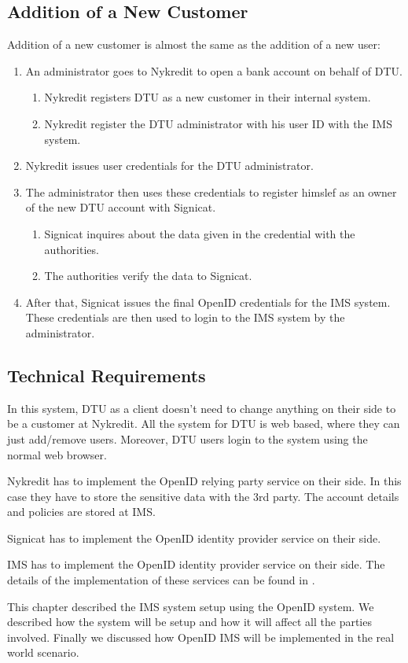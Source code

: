 \FloatBarrier
\subsection{Addition of a New Customer}
Addition of a new customer is almost the same as the addition of a new user:
\begin{enumerate}
	\item An administrator goes to Nykredit to open a bank account on behalf of DTU. 
	\begin{enumerate}
		\item Nykredit registers DTU as a new customer in their internal system.
		\item Nykredit register the DTU administrator with his user ID with the IMS system.
	\end{enumerate}
	\item Nykredit issues user credentials for the  DTU administrator.
	\item The administrator then uses these credentials to register himslef as an owner of the new DTU account with Signicat. 
	\begin{enumerate}
		\item Signicat inquires about the data given in the credential with the authorities.
		\item The authorities verify the data to Signicat.
	\end{enumerate}
	\item After that, Signicat issues the final OpenID credentials for the IMS system. These credentials are then used to login to the IMS system by the administrator.
\end{enumerate}
\subsection{Technical Requirements}
In this system, DTU as a client doesn't need to change anything on their side to be a customer at Nykredit. All the system for DTU is web based, where they can just add/remove users. Moreover, DTU users login to the system using the normal web browser.

Nykredit has to implement the OpenID relying party service on their side. In this case they have to store the sensitive data with the 3rd party. The account details and policies are stored at IMS.

Signicat has to implement the OpenID identity provider service on their side.

IMS has to implement the OpenID identity provider service on their side.
The details of the implementation of these services can be found in \cite{recordon2006openid}.

This chapter described the IMS system setup using the OpenID system. We described how the system will be setup and how it will affect all the parties involved. Finally we discussed how OpenID IMS will be implemented in the real world scenario.

